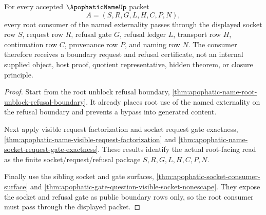 \begin{theorem}
\label{thm:apophatic-name-root-consumer-socket-request-totality}
For every accepted $\ApophaticNameUp$ packet
$$
A=(S,R,G,L,H,C,P,N),
$$
every root consumer of the named externality passes through the displayed socket row $S$, request row $R$, refusal gate $G$, refusal ledger $L$, transport row $H$, continuation row $C$, provenance row $P$, and naming row $N$. The consumer therefore receives a boundary request and refusal certificate, not an internal supplied object, host proof, quotient representative, hidden theorem, or closure principle.
\end{theorem}
\begin{proof}
Start from the root unblock refusal boundary, \autoref{thm:apophatic-name-root-unblock-refusal-boundary}. It already places root use of the named externality on the refusal boundary and prevents a bypass into generated content.

Next apply visible request factorization and socket request gate exactness, \autoref{thm:apophatic-name-visible-request-factorization} and \autoref{thm:apophatic-name-socket-request-gate-exactness}. These results identify the actual root-facing read as the finite socket/request/refusal package $S,R,G,L,H,C,P,N$.

Finally use the sibling socket and gate surfaces, \autoref{thm:apophatic-socket-consumer-surface} and \autoref{thm:apophatic-gate-question-visible-socket-nonescape}. They expose the socket and refusal gate as public boundary rows only, so the root consumer must pass through the displayed packet.
\end{proof}

